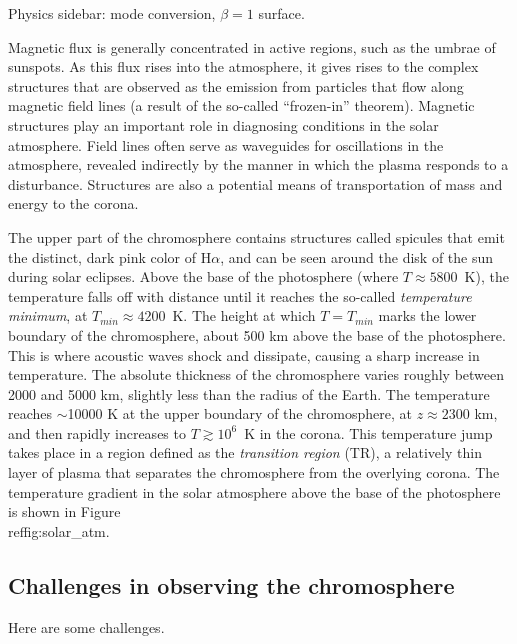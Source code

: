\begin{framed}
    Physics sidebar: mode conversion, $\beta = 1$ surface.
\end{framed}

Magnetic flux is generally concentrated in active regions, such as the umbrae
of sunspots. As this flux rises into the atmosphere, it gives rises to the
complex structures that are observed as the emission from particles that flow
along magnetic field lines (a result of the so-called ``frozen-in'' theorem).
Magnetic structures play an important role in diagnosing conditions in the
solar atmosphere. Field lines often serve as waveguides for oscillations in the
atmosphere, revealed indirectly by the manner in which the plasma responds to a
disturbance. Structures are also a potential means of transportation of mass
and energy to the corona.


The upper part of
the chromosphere contains structures called spicules that emit the distinct,
dark pink color of H$\alpha$, and can be seen around the disk of the sun during
solar eclipses. Above the base of the photosphere (where $T \approx 5800$~K),
the temperature falls off with distance until it reaches the so-called
\textit{temperature minimum}, at $T_{min} \approx 4200$~K. The height at which
$T = T_{min}$ marks the lower boundary of the chromosphere, about 500 km above
the base of the photosphere. This is where acoustic waves shock and dissipate,
causing a sharp increase in temperature. The absolute thickness of the
chromosphere varies roughly between 2000 and 5000 km, slightly less than the
radius of the Earth. The temperature reaches $\sim$10000 K at the upper
boundary of the chromosphere, at $z \approx 2300$ km, and then rapidly
increases to $T\!\gtrsim\!10^{6}$~K in the corona.
This temperature jump takes
place in a region defined as the \textit{transition region} (TR), a relatively
thin layer of plasma that separates the chromosphere from the overlying corona.
The temperature gradient in the solar atmosphere above the base of the
photosphere is shown in
Figure~\\ref{fig:solar\_atm}.



\subsection{Challenges in observing the chromosphere}

Here are some challenges.



